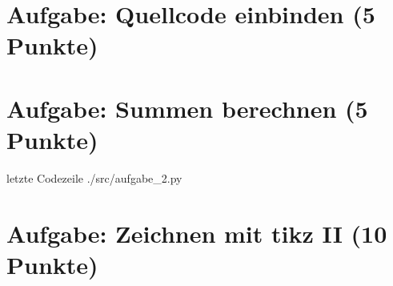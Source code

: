 
\newcommand{\dozent}{Prof. Dr. Claudia Müller-Birn, Barry Linnert}					%
\newcommand{\tutor}{Thierry Meurers}						%
\newcommand{\tutoriumNo}{10}				%
\newcommand{\ubungNo}{01}									%
\newcommand{\veranstaltung}{Objektorientierte Programmierung}	%
\newcommand{\semester}{SoSe 17}						%
\newcommand{\studenten}{Stefaan Hessmann, Jaap Pedersen, Mark Niehues}			%




\section{Aufgabe: Quellcode einbinden \hfill (5 Punkte)}

\section{Aufgabe: Summen berechnen \hfill (5 Punkte)}

 letzte Codezeile
{./src/aufgabe_2.py}

\section{Aufgabe: Zeichnen mit tikz II (10 Punkte)}


